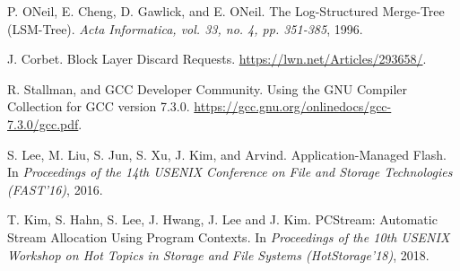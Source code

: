 \begin{thebibliography}{00}
P. ONeil, E. Cheng, D. Gawlick, and E. ONeil.
The Log-Structured Merge-Tree (LSM-Tree).
\textit{Acta Informatica, vol. 33, no. 4, pp. 351-385}, 1996.

J. Corbet.
Block Layer Discard Requests.
\url{https://lwn.net/Articles/293658/}.

R. Stallman, and GCC Developer Community.
Using the GNU Compiler Collection for GCC version 7.3.0.
\url{https://gcc.gnu.org/onlinedocs/gcc-7.3.0/gcc.pdf}.


S. Lee, M. Liu, S. Jun, S. Xu, J. Kim, and Arvind.
Application-Managed Flash.
In \textit{Proceedings of the 14th USENIX Conference on File and Storage
Technologies (FAST'16)}, 2016.

T. Kim, S. Hahn, S. Lee, J. Hwang, J. Lee and J. Kim.
PCStream: Automatic Stream Allocation Using Program Contexts.
In \textit{Proceedings of the 10th USENIX Workshop on Hot Topics in Storage
and File Systems (HotStorage'18)}, 2018.

\end{thebibliography}
